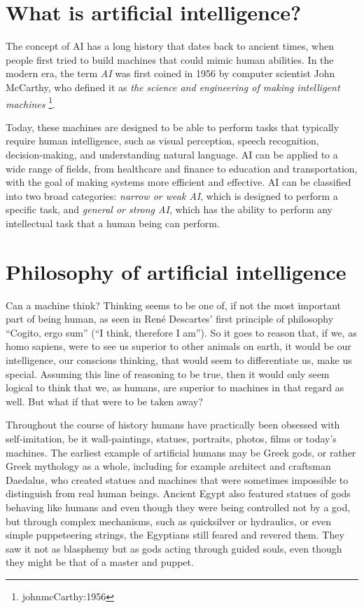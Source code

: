 \section{What is artificial intelligence?}
The concept of AI has a long history that dates back to ancient times,
when people first tried to build machines that could mimic human abilities.
In the modern era, the term \textit{AI}  was first coined in 1956 by computer scientist 
John McCarthy, who defined it as \textit{the science and engineering of making 
intelligent machines} \footnote{johnmcCarthy:1956}.

Today, these machines are designed to be able to perform tasks that typically 
require human intelligence, such as visual perception, speech recognition,
decision-making, and understanding natural language. AI can be applied to a wide
range of fields, from healthcare and finance to education and transportation,
with the goal of making systems more efficient and effective.
AI can be classified into two broad categories: \textit{narrow or weak AI},
which is designed to perform a specific task, and \textit{general or strong AI},
 which has the ability to perform any intellectual task that a human being can perform. \cite{KindsOfAI}

\section{Philosophy of artificial intelligence}
Can a machine think? Thinking seems to be one of, if not the most important part of being human, as seen in René Descartes' 
first principle of philosophy “Cogito, ergo sum” (“I think, therefore I am”). So it goes to reason that, if we, as 
homo sapiens, were to see us superior to other animals on earth, it would be our intelligence, our conscious thinking, 
that would seem to differentiate us, make us special. Assuming this line of reasoning to be true, then it would only 
seem logical to think that we, as humans, are superior to machines in that regard as well. But what if that were to be taken away?

Throughout the course of history humans have practically been obsessed with self-imitation, be it wall-paintings, 
statues, portraits, photos, films or today's machines. The earliest example of artificial humans may be Greek gods, 
or rather Greek mythology as a whole, including for example architect and craftsman Daedalus, who created statues and 
machines that were sometimes impossible to distinguish from real human beings. Ancient Egypt also featured statues of 
gods behaving like humans and even though they were being controlled not by a god, but through complex mechanisms, 
such as quicksilver or hydraulics, or even simple puppeteering strings, the Egyptians still feared and revered them. 
They saw it not as blasphemy but as gods acting through guided souls, even though they might be that of a master and puppet.

